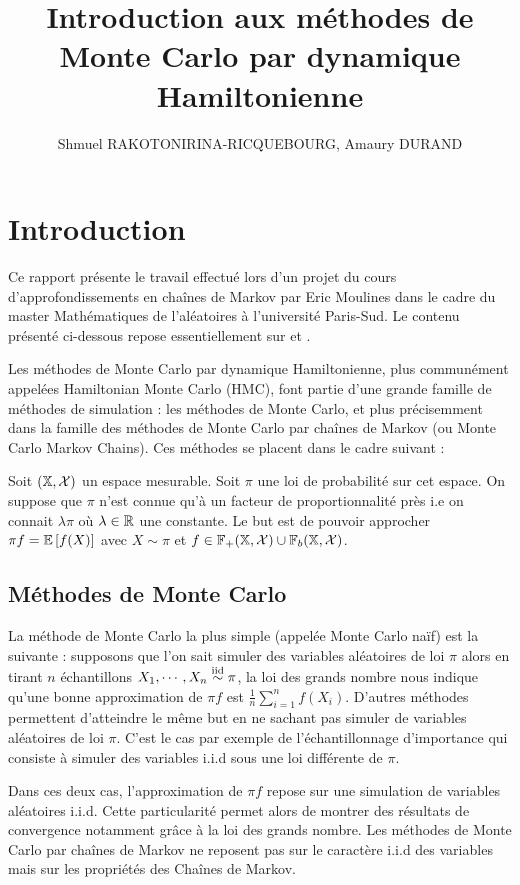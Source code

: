 \documentclass[10pt,a4paper]{article}
\title{Introduction aux méthodes de Monte Carlo par dynamique Hamiltonienne}
\author{Shmuel RAKOTONIRINA-RICQUEBOURG, Amaury DURAND}
\begin{document}
\maketitle
\tableofcontents
\section{Introduction}
Ce rapport présente le travail effectué lors d'un projet du cours d'approfondissements en chaînes de Markov par Eric Moulines dans le cadre du master Mathématiques de l'aléatoires à l'université Paris-Sud. Le contenu présenté ci-dessous repose essentiellement sur \cite{Neal-hmc} et \cite{Douc-mc}. 

Les méthodes de Monte Carlo par dynamique Hamiltonienne, plus communément appelées Hamiltonian Monte Carlo (HMC), font partie d'une grande famille de méthodes de simulation : les méthodes de Monte Carlo, et plus précisemment dans la famille des méthodes de Monte Carlo par chaînes de Markov (ou Monte Carlo Markov Chains). Ces méthodes se placent dans le cadre suivant :
\begin{Def}
	Soit $(\mathbb{X}, \mathcal{X})$ un espace mesurable. Soit $\pi$ une loi de probabilité sur cet espace. On suppose que $\pi$ n'est connue qu'à un facteur de proportionnalité près i.e on connait $\lambda \pi$ où $\lambda \in \mathbb{R}$ une constante. Le but est de pouvoir approcher $\pi f = \EE[f(X)]$ avec $X \sim \pi$ et $f \in \mathbb{F}_+(\mathbb{X}, \mathcal{X}) \cup \mathbb{F}_b(\mathbb{X}, \mathcal{X})$.
\end{Def}

\subsection{Méthodes de Monte Carlo}

La méthode de Monte Carlo la plus simple (appelée Monte Carlo naïf) est la suivante : supposons que l'on sait simuler des variables aléatoires de loi $\pi$ alors en tirant $n$ échantillons $X_1, \cdots, X_n \stackrel{\rm iid}{\sim} \pi$, la loi des grands nombre nous indique qu'une bonne approximation de $\pi f$ est $\frac{1}{n} \sum_{i=1}^n f(X_i)$. D'autres méthodes permettent d'atteindre le même but en ne sachant pas simuler de variables aléatoires de loi $\pi$. C'est le cas par exemple de l'échantillonnage d'importance qui consiste à simuler des variables i.i.d sous une loi différente de $\pi$.

Dans ces deux cas, l'approximation de $\pi f$ repose sur une simulation de variables aléatoires i.i.d. Cette particularité permet alors de montrer des résultats de convergence notamment grâce à la loi des grands nombre. Les méthodes de Monte Carlo par chaînes de Markov ne reposent pas sur le caractère i.i.d des variables mais sur les propriétés des Chaînes de Markov. 
\end{document}
